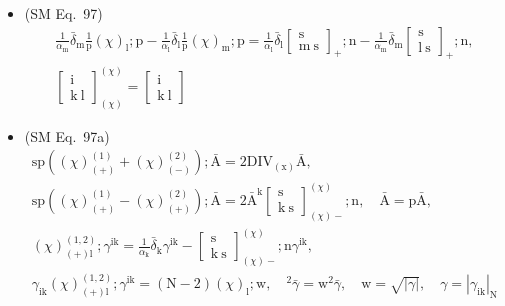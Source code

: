 \documentclass[12pt]{article}
\begin{document}
\begin{itemize}[label={},leftmargin=0pt]
    \item (SM Eq.\ 97) 
    \[
    \begin{gathered}
    \frac{1}{\alpha_\mathrm{m}}\bar{\delta}_\mathrm{m} \frac{1}{\mathrm{p}}(\chi)_\mathrm{l};\mathrm{p} - \frac{1}{\alpha_\mathrm{l}}\bar{\delta}_\mathrm{l} \frac{1}{\mathrm{p}}(\chi)_\mathrm{m};\mathrm{p} = \frac{1}{\alpha_\mathrm{l}}\bar{\delta}_\mathrm{l} \left[ \begin{smallmatrix} \mathrm{s} \\ \mathrm{m}\ \mathrm{s} \end{smallmatrix} \right]_+;\mathrm{n} - \frac{1}{\alpha_\mathrm{m}}\bar{\delta}_\mathrm{m} \left[ \begin{smallmatrix} \mathrm{s} \\ \mathrm{l}\ \mathrm{s} \end{smallmatrix} \right]_+;\mathrm{n}, \\
    \left[ \begin{smallmatrix} \mathrm{i} \\ \mathrm{k}\ \mathrm{l} \end{smallmatrix} \right]^{(\chi)}_{(\chi)} = \left[ \begin{smallmatrix} \mathrm{i} \\ \mathrm{k}\ \mathrm{l} \end{smallmatrix} \right]
    \end{gathered}
    \]

    \item (SM Eq.\ 97a) 
    \[
    \begin{gathered}
    \mathrm{sp}\left((\chi)^{(1)}_{(+)} + (\chi)^{(2)}_{(-)}\right); \bar{\mathrm{A}} = 2\mathrm{DIV}_{(\mathrm{x})}\bar{\mathrm{A}}, \\
    \mathrm{sp}\left((\chi)^{(1)}_{(+)} - (\chi)^{(2)}_{(+)}\right); \bar{\mathrm{A}} = 2\bar{\mathrm{A}}^\mathrm{k} \left[ \begin{smallmatrix} \mathrm{s} \\ \mathrm{k\ s} \end{smallmatrix} \right]^{(\chi)}_{(\chi)-}; \mathrm{n}, \quad \bar{\mathrm{A}} = \mathrm{p}\bar{\mathrm{A}}, \\
    (\chi)^{(1,2)}_{(+)\mathrm{l}} ; \gamma^{\mathrm{ik}} = \frac{1}{\alpha_\mathrm{k}}\bar{\delta}_\mathrm{k} \gamma^{\mathrm{ik}} - \left[ \begin{smallmatrix} \mathrm{s} \\ \mathrm{k\ s} \end{smallmatrix} \right]^{(\chi)}_{(\chi)-}; \mathrm{n} \gamma^{\mathrm{ik}}, \\
    \gamma_{\mathrm{ik}}(\chi)^{(1,2)}_{(+)\mathrm{l}} ; \gamma^{\mathrm{ik}} = (\mathrm{N}-2)(\chi)_\mathrm{l} ; \mathrm{w}, \quad {}^2\bar{\gamma} = \mathrm{w}^2 \bar{\gamma}, \quad \mathrm{w} = \sqrt{|\gamma|}, \quad \gamma = |\gamma_{\mathrm{ik}}|_\mathrm{N}
    \end{gathered}
    \]


\end{itemize}
\end{document}
